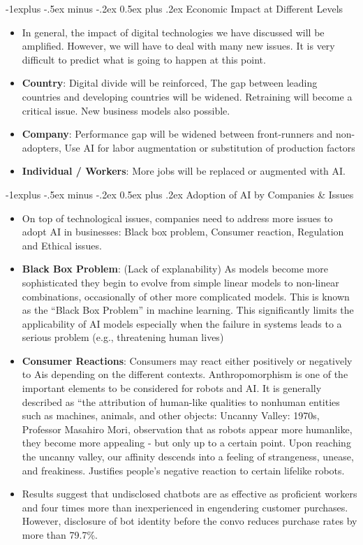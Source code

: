 \documentclass[12pt, landscape]{article}
\makeatletter
\renewcommand{\subsection}{\@startsection{subsection}{2}{0mm}%
                                {-1explus -.5ex minus -.2ex}%
                                {0.5ex plus .2ex}%
                                {\normalfont\normalsize\bfseries}}
\makeatother
\begin{document}
\begin{multicols*}{3}
\subsection{Economic Impact at Different Levels}
\begin{itemize}
\item In general, the impact of digital technologies we have discussed will be amplified. However, we will have to deal with many new issues. It is very difficult to predict what is going to happen at this point.
\item \textbf{Country}: Digital divide will be reinforced, The gap between leading countries and developing countries will be widened. Retraining will become a critical issue. New business models also possible.
\item \textbf{Company}: Performance gap will be widened between front-runners and non-adopters, Use AI for labor augmentation or substitution of production factors
\item \textbf{Individual / Workers}: More jobs will be replaced or augmented with AI.
\end{itemize}
\subsection{Adoption of AI by Companies \& Issues}
\begin{itemize}
\item On top of technological issues, companies need to address more issues to adopt AI in businesses: Black box problem, Consumer reaction, Regulation and Ethical issues.
\item \textbf{Black Box Problem}: (Lack of explanability) As models become more sophisticated they begin to evolve from simple linear models to non-linear combinations, occasionally of other more complicated models. This is known as the “Black Box Problem” in machine learning. This significantly limits the applicability of AI models especially when the failure in systems leads to a serious problem (e.g., threatening human lives)
\item \textbf{Consumer Reactions}: Consumers may react either positively or negatively to Ais depending on the different contexts. Anthropomorphism is one of the important elements to be considered for robots and AI. It is generally described as “the attribution of human-like qualities to nonhuman entities such as machines, animals, and other objects: Uncanny Valley: 1970s, Professor Masahiro Mori, observation that as robots appear more humanlike, they become more appealing - but only up to a certain point. Upon reaching the uncanny valley, our affinity descends into a feeling of strangeness, unease, and freakiness. Justifies people’s negative reaction to certain lifelike robots.
\item Results suggest that undisclosed chatbots are as effective as proficient workers and four times more than inexperienced in engendering customer purchases. However, disclosure of bot identity before the convo reduces purchase rates by more than 79.7\%.
\end{itemize}


\end{multicols*}
\end{document}
